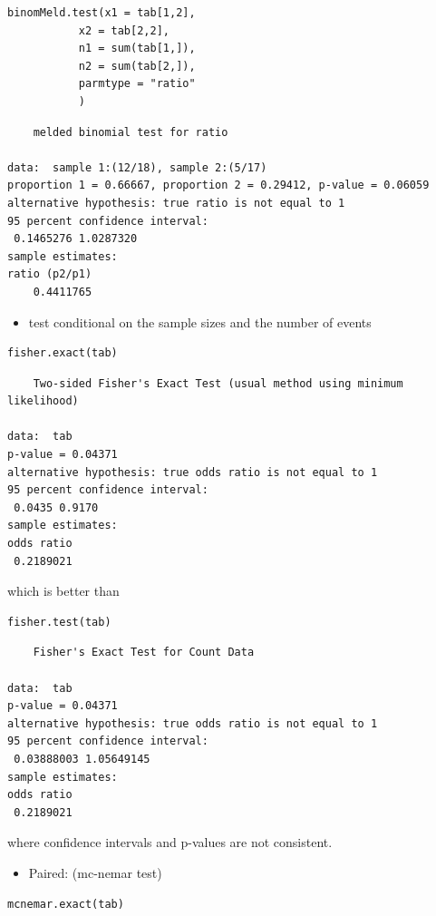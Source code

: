\documentclass{article}
\begin{document}
\lstset{language=r,label= ,caption= ,captionpos=b,numbers=none}
\begin{lstlisting}
binomMeld.test(x1 = tab[1,2],
	       x2 = tab[2,2],
	       n1 = sum(tab[1,]),
	       n2 = sum(tab[2,]),
	       parmtype = "ratio"
	       )
\end{lstlisting}

\begin{verbatim}
	melded binomial test for ratio

data:  sample 1:(12/18), sample 2:(5/17)
proportion 1 = 0.66667, proportion 2 = 0.29412, p-value = 0.06059
alternative hypothesis: true ratio is not equal to 1
95 percent confidence interval:
 0.1465276 1.0287320
sample estimates:
ratio (p2/p1) 
    0.4411765
\end{verbatim}

\bigskip

\begin{itemize}
\item test conditional on the sample sizes and the number of events
\end{itemize}
\lstset{language=r,label= ,caption= ,captionpos=b,numbers=none}
\begin{lstlisting}
fisher.exact(tab)
\end{lstlisting}

\begin{verbatim}
	Two-sided Fisher's Exact Test (usual method using minimum likelihood)

data:  tab
p-value = 0.04371
alternative hypothesis: true odds ratio is not equal to 1
95 percent confidence interval:
 0.0435 0.9170
sample estimates:
odds ratio 
 0.2189021
\end{verbatim}

which is better than
\lstset{language=r,label= ,caption= ,captionpos=b,numbers=none}
\begin{lstlisting}
fisher.test(tab)
\end{lstlisting}

\begin{verbatim}
	Fisher's Exact Test for Count Data

data:  tab
p-value = 0.04371
alternative hypothesis: true odds ratio is not equal to 1
95 percent confidence interval:
 0.03888003 1.05649145
sample estimates:
odds ratio 
 0.2189021
\end{verbatim}
where confidence intervals and p-values are not consistent.

\bigskip

\begin{itemize}
\item Paired: (mc-nemar test)
\end{itemize}
\lstset{language=r,label= ,caption= ,captionpos=b,numbers=none}
\begin{lstlisting}
mcnemar.exact(tab)
\end{lstlisting}
\end{document}
